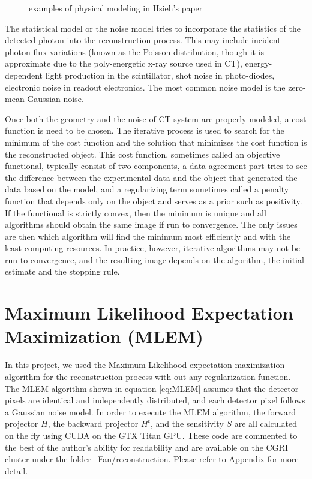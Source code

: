 \begin{figure}
\centering
	\begin{subfigure}[b]{0.4\linewidth}
	\centering
	\end{subfigure}
\hspace{0.2cm}
	\begin{subfigure}[b]{0.4\linewidth}
	\centering
	\end{subfigure}
\caption{examples of physical modeling in Hsieh's paper}
\label{fig:physical_modeling}
\end{figure}

The statistical model or the noise model tries to incorporate the statistics of the detected photon into the reconstruction process.  This may include incident photon flux variations (known as the Poisson distribution, though it is approximate due to the poly-energetic x-ray source used in CT), energy-dependent light production in the scintillator, shot noise in photo-diodes, electronic noise in readout electronics. The most common noise model is the zero-mean Gaussian noise.

Once both the geometry and the noise of CT system are properly modeled, a cost function is need to be chosen.  The iterative process is used to search for the minimum of the cost function and the solution that minimizes the cost function is the reconstructed object.  This cost function, sometimes called an objective functional, typically consist of two components, a data agreement part tries to see the difference between the experimental data and the object that generated the data based on the model, and a regularizing term sometimes called a penalty function that depends only on the object and serves as a prior such as positivity.  If the functional is strictly convex, then the minimum is unique and all algorithms should obtain the same image if run to convergence.  The only issues are then which algorithm will find the minimum most efficiently and with the least computing resources.  In practice, however, iterative algorithms may not be run to convergence, and the resulting image depends on the algorithm, the initial estimate and the stopping rule.

\section{Maximum Likelihood Expectation Maximization (MLEM) }
In this project, we used the Maximum Likelihood expectation maximization algorithm for the reconstruction process with out any regularization function.  The MLEM algorithm shown in equation \ref{eq:MLEM} assumes that the detector pixels are identical and independently distributed, and each detector pixel follows a Gaussian noise model.  In order to execute the MLEM algorithm, the forward projector $H$, the backward projector $H^t$, and the sensitivity $S$ are all calculated on the fly using CUDA on the GTX Titan GPU.  These code are commented to the best of the author's ability for readability and are available on the CGRI cluster under the folder ~Fan/reconstruction.  Please refer to Appendix for more detail.

